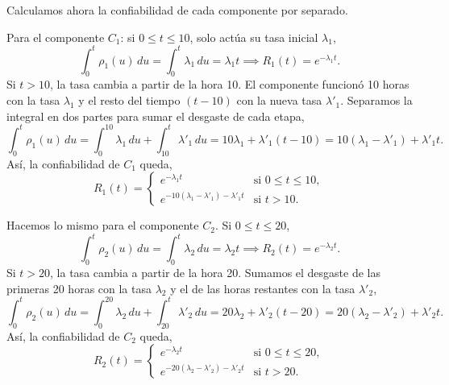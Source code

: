 \documentclass[practices.tex]{subfiles}%
\begin{document}
\vspace{2mm}
Calculamos ahora la confiabilidad de cada componente por separado.

Para el componente $C_1$: si $0 \le t \le 10$, solo actúa su tasa inicial $\lambda_1$,
\begin{equation*}
    \int_0^t \rho_1(u)\,du = \int_0^t \lambda_1\,du = \lambda_1 t \implies R_1(t) = e^{-\lambda_1 t}.
\end{equation*}
Si $t > 10$, la tasa cambia a partir de la hora 10. El componente funcionó 10 horas con la tasa $\lambda_1$ y el resto del tiempo $(t - 10)$ con la nueva tasa $\lambda'_1$. Separamos la integral en dos partes para sumar el desgaste de cada etapa,
\begin{equation*}
    \int_0^t \rho_1(u)\,du = \int_0^{10} \lambda_1\,du + \int_{10}^t \lambda'_1\,du = 10\lambda_1 + \lambda'_1(t - 10) = 10(\lambda_1 - \lambda'_1) + \lambda'_1 t.
\end{equation*}
Así, la confiabilidad de $C_1$ queda,
\begin{equation*}
    R_1(t) = \begin{cases}
        e^{-\lambda_1 t} & \text{si } 0 \le t \le 10, \\[2mm]
        e^{-10(\lambda_1 - \lambda'_1) - \lambda'_1 t} & \text{si } t > 10.
    \end{cases}
\end{equation*}

Hacemos lo mismo para el componente $C_2$. Si $0 \le t \le 20$,
\begin{equation*}
    \int_0^t \rho_2(u)\,du = \int_0^t \lambda_2\,du = \lambda_2 t \implies R_2(t) = e^{-\lambda_2 t}.
\end{equation*}
Si $t > 20$, la tasa cambia a partir de la hora 20. Sumamos el desgaste de las primeras 20 horas con la tasa $\lambda_2$ y el de las horas restantes con la tasa $\lambda'_2$,
\begin{equation*}
    \int_0^t \rho_2(u)\,du = \int_0^{20} \lambda_2\,du + \int_{20}^t \lambda'_2\,du = 20\lambda_2 + \lambda'_2(t - 20) = 20(\lambda_2 - \lambda'_2) + \lambda'_2 t.
\end{equation*}
Así, la confiabilidad de $C_2$ queda,
\begin{equation*}
    R_2(t) = \begin{cases}
        e^{-\lambda_2 t} & \text{si } 0 \le t \le 20, \\[2mm]
        e^{-20(\lambda_2 - \lambda'_2) - \lambda'_2 t} & \text{si } t > 20.
    \end{cases}
\end{equation*}
\end{document}
